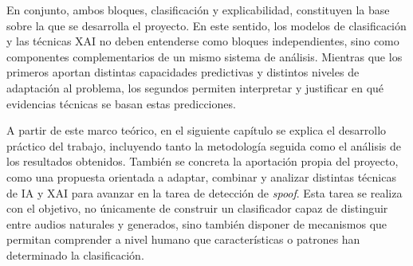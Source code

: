 En conjunto, ambos bloques, clasificación y explicabilidad, constituyen la base sobre la que se desarrolla el proyecto. En este sentido, los modelos de clasificación y las técnicas XAI no deben entenderse como bloques independientes, sino como componentes complementarios de un mismo sistema de análisis. Mientras que los primeros aportan distintas capacidades predictivas y distintos niveles de adaptación al problema, los segundos permiten interpretar y justificar en qué evidencias técnicas se basan estas predicciones.

A partir de este marco teórico, en el siguiente capítulo se explica el desarrollo práctico del trabajo, incluyendo tanto la metodología seguida como el análisis de los resultados obtenidos. También se concreta la aportación propia del proyecto, como una propuesta orientada a adaptar, combinar y analizar distintas técnicas de IA y XAI para avanzar en la tarea de detección de \textit{spoof}. Esta tarea se realiza con el objetivo, no únicamente de construir un clasificador capaz de distinguir entre audios naturales y generados, sino también disponer de mecanismos que permitan comprender a nivel humano que características o patrones han determinado la clasificación.
